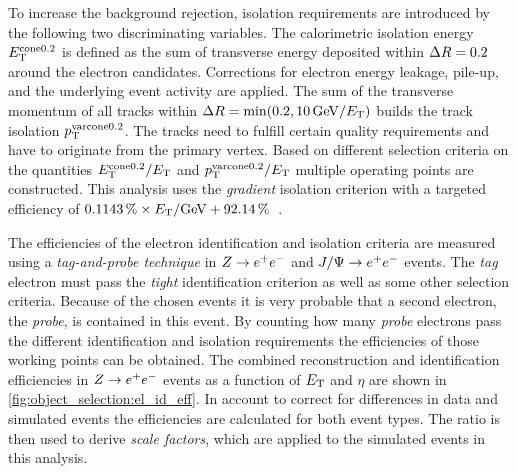To increase the background rejection, isolation requirements are introduced by the following two discriminating variables.
The calorimetric isolation energy $E_\text{T}^{\text{cone}0.2}$ is defined as the sum of transverse energy deposited within
$\Delta R = 0.2$ around the electron candidates.
Corrections for electron energy leakage, pile-up, and the underlying event activity are applied.
The sum of the transverse momentum of all tracks within $\dr = \min(0.2, \unit[10]{GeV} / \et)$ builds the
track isolation $p_\text{T}^{\text{varcone}0.2}$. The tracks need to fulfill certain quality requirements and have to originate
from the primary vertex.
Based on different selection criteria on the quantities $E_\text{T}^{\text{cone}0.2} / E_\text{T}$ and
$p_\text{T}^{\text{varcone}0.2} / E_\text{T}$ multiple operating points are constructed. This analysis uses the \emph{gradient}
isolation criterion with a targeted efficiency of
$\unit[0.1143]{\%} \times \et / \text{GeV} + \unit[92.14]{\%}$~\cite{ATLAS-CONF-2016-024}.

The efficiencies of the electron identification and isolation criteria are measured using a \emph{tag-and-probe technique}
in $Z \to e^+e^-$ and $J/\Psi \to e^+e^-$ events.
The \emph{tag} electron must pass the \emph{tight} identification criterion as well as some other selection criteria.
Because of the chosen events it is very probable that a second electron, the \emph{probe}, is contained in this event.
By counting how many \emph{probe} electrons pass the different identification and isolation requirements the efficiencies
of those working points can be obtained.
The combined reconstruction and identification efficiencies in $Z \to e^+e^-$ events as a function of $E_\text{T}$ and $\eta$
are shown in \cref{fig:object_selection:el_id_eff}.
In account to correct for differences in data and simulated events the efficiencies are calculated for both event types.
The ratio is then used to derive \emph{scale factors}, which are applied to the simulated events in this analysis.


